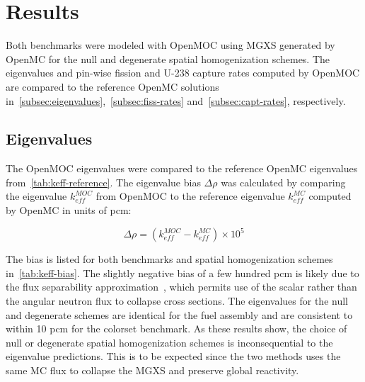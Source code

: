 \section{Results}
\label{sec:results}

Both benchmarks were modeled with OpenMOC using MGXS generated by OpenMC for the null and degenerate spatial homogenization schemes. The eigenvalues and pin-wise fission and U-238 capture rates computed by OpenMOC are compared to the reference OpenMC solutions in~\autoref{subsec:eigenvalues},~\autoref{subsec:fiss-rates} and~\autoref{subsec:capt-rates}, respectively.


\subsection{Eigenvalues}
\label{subsec:eigenvalues}

The OpenMOC eigenvalues were compared to the reference OpenMC eigenvalues from~\autoref{tab:keff-reference}. The eigenvalue bias $\Delta\rho$ was calculated by comparing the eigenvalue $k_{eff}^{MOC}$ from OpenMOC to the reference eigenvalue $k_{eff}^{MC}$ computed by OpenMC in units of pcm:

\begin{equation}
\label{eqn:delta-rho}
\Delta\rho = \left(k_{eff}^{MOC} - k_{eff}^{MC}\right) \times 10^{5}
\end{equation}

The bias is listed for both benchmarks and spatial homogenization schemes in~\autoref{tab:keff-bias}. The slightly negative bias of a few hundred pcm is likely due to the flux separability approximation~\citep{boyd2017sph}, which permits use of the scalar rather than the angular neutron flux to collapse cross sections. The eigenvalues for the null and degenerate schemes are identical for the fuel assembly and are consistent to within 10 pcm for the colorset benchmark. As these results show, the choice of null or degenerate spatial homogenization schemes is inconsequential to the eigenvalue predictions. This is to be expected since the two methods uses the same MC flux to collapse the MGXS and preserve global reactivity.


